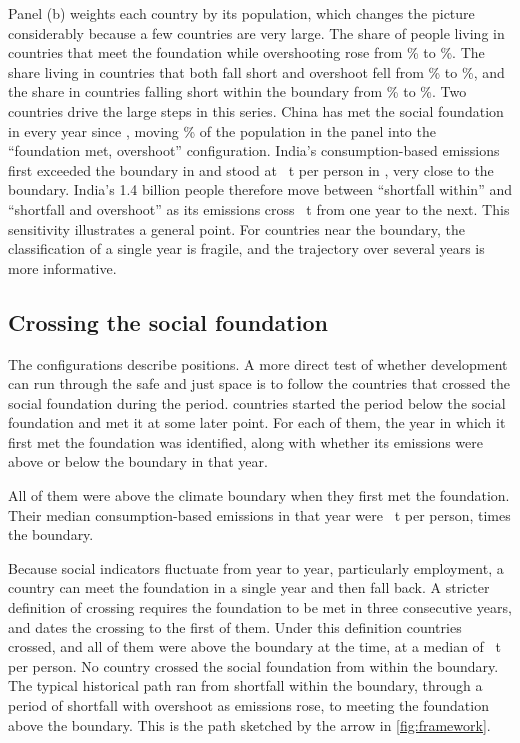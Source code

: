 Panel (b) weights each country by its population, which changes the picture considerably because a few countries are very large. The share of people living in countries that meet the foundation while overshooting rose from \nPopOverStart\% to \nPopOverEnd\%. The share living in countries that both fall short and overshoot fell from \nPopTrapStart\% to \nPopTrapEnd\%, and the share in countries falling short within the boundary from \nPopWithinStart\% to \nPopWithinEnd\%. Two countries drive the large steps in this series. China has met the social foundation in every year since \nChinaFirstMet, moving \nChinaPopShare\% of the population in the panel into the ``foundation met, overshoot'' configuration. India's consumption-based emissions first exceeded the boundary in \nIndiaFirstOver{} and stood at \nIndiaEndCons~t per person in \nLastYear, very close to the boundary. India's 1.4 billion people therefore move between ``shortfall within'' and ``shortfall and overshoot'' as its emissions cross \nBoundary~t from one year to the next. This sensitivity illustrates a general point. For countries near the boundary, the classification of a single year is fragile, and the trajectory over several years is more informative.

\subsection{Crossing the social foundation}\label{sec:res-cross}

The configurations describe positions. A more direct test of whether development can run through the safe and just space is to follow the countries that crossed the social foundation during the period. \nNCrossers{} countries started the period below the social foundation and met it at some later point. For each of them, the year in which it first met the foundation was identified, along with whether its emissions were above or below the boundary in that year.

All \nNCrossersAbove{} of them were above the climate boundary when they first met the foundation. Their median consumption-based emissions in that year were \nCrossCarbonMedian~t per person, \nCrossCarbonMultiple{} times the boundary.

Because social indicators fluctuate from year to year, particularly employment, a country can meet the foundation in a single year and then fall back. A stricter definition of crossing requires the foundation to be met in three consecutive years, and dates the crossing to the first of them. Under this definition \nNCrossersSust{} countries crossed, and all \nNCrossersSustAbove{} of them were above the boundary at the time, at a median of \nCrossSustCarbonMedian~t per person. No country crossed the social foundation from within the boundary. The typical historical path ran from shortfall within the boundary, through a period of shortfall with overshoot as emissions rose, to meeting the foundation above the boundary. This is the path sketched by the arrow in \cref{fig:framework}.

